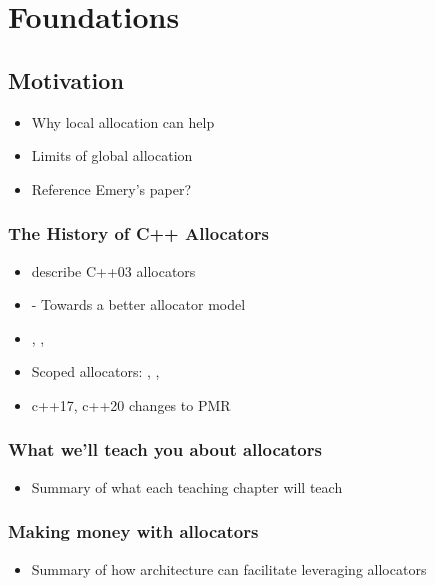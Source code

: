 \chapter{Foundations}

\section{Motivation}

\begin{itemize}
\item Why local allocation can help
\item Limits of global allocation
\item Reference Emery's paper?
\end{itemize}

\subsection{The History of C++ Allocators}

\begin{itemize}
\item describe C++03 allocators
\item \cite{wg21N1850} - Towards a better allocator model
\item \cite{wg21N2387}, \cite{wg21N2436},
\item Scoped allocators: \cite{wg21N2446}, \cite{wg21N2523}, 
\item c++17, c++20  changes to PMR
\end{itemize}

\subsection{What we'll teach you about allocators}

\begin{itemize}
\item Summary of what each teaching chapter will teach
\end{itemize}

\subsection{Making money with allocators}

\begin{itemize}
\item Summary of how architecture can facilitate leveraging allocators
\end{itemize}

